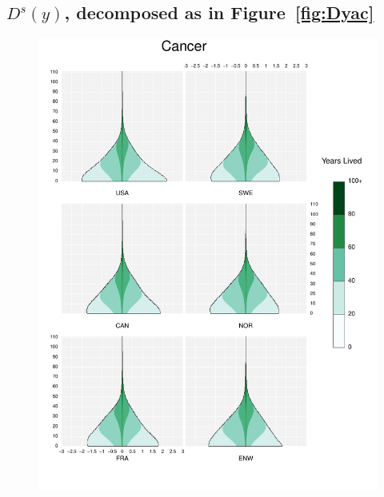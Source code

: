 \documentclass{article}
\begin{document}
\begin{appendices}
\subsection{$D^s(y)$, decomposed as in Figure~\ref{fig:Dyac}}
\begin{figure}
\centering
\includegraphics[scale=.8]{Figures/Causes/DyxCancer.pdf}
\end{figure}
\begin{figure}
\centering

\end{figure}
\end{appendices}
\end{document}

